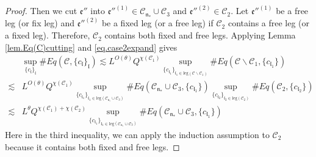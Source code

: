 \begin{proof}
    Then we cut $\mathfrak{e}''$ into $\mathfrak{e}''^{(1)}\in \mathcal{C}_{\mathfrak{n}_*}\cup \mathcal{C}_3$ and $\mathfrak{e}''^{(2)}\in \mathcal{C}_2$. Let $\mathfrak{e}''^{(1)}$ be a free leg (or fix leg) and $\mathfrak{e}''^{(2)}$ be a fixed leg (or a free leg) if $\mathcal{C}_2$ contains a free leg (or a fixed leg). Therefore, $\mathcal{C}_2$ contains both fixed and free legs. Applying Lemma \ref{lem.Eq(C)cutting} and \eqref{eq.case2expand} gives
    \begin{equation}\label{eq.case2expand'}
    \begin{split}
     &\sup_{\{c_{\mathfrak{l}}\}_{\mathfrak{l}}}\#Eq(\mathcal{C},\{c_{\mathfrak{l}}\}_{\mathfrak{l}})
     \lesssim L^{O(\theta)} Q^{\chi(\mathcal{C}_1)}\sup_{\{c_{\mathfrak{l}_1}\}_{\mathfrak{l}_1\in \text{leg}(\mathcal{C}\backslash\mathcal{C}_1)} } \# Eq(\mathcal{C}\backslash\mathcal{C}_1,\{c_{\mathfrak{l}_1}\})
     \\
     \lesssim& L^{O(\theta)} Q^{\chi(\mathcal{C}_1)}\sup_{\{c_{\mathfrak{l}_1}\}_{\mathfrak{l}_1\in \text{leg}(\mathcal{C}_{\mathfrak{n}_*}\cup \mathcal{C}_3)} } \# Eq(\mathcal{C}_{\mathfrak{n}_*}\cup \mathcal{C}_3,\{c_{\mathfrak{l}_1}\}) \sup_{\{c_{\mathfrak{l}_2}\}_{\mathfrak{l}_2\in \text{leg}(\mathcal{C}_2)} }\# Eq(\mathcal{C}_{2}, \{c_{\mathfrak{l}_2}\})
     \\
     \lesssim& L^\theta Q^{\chi(\mathcal{C}_1)+\chi(\mathcal{C}_2)}\sup_{\{c_{\mathfrak{l}_1}\}_{\mathfrak{l}_1\in \text{leg}(\mathcal{C}_{\mathfrak{n}_*}\cup \mathcal{C}_3)} } \# Eq(\mathcal{C}_{\mathfrak{n}_*}\cup \mathcal{C}_3,\{c_{\mathfrak{l}_1}\}) 
    \end{split}
    \end{equation}
    Here in the third inequality, we can apply the induction assumption to $\mathcal{C}_2$ because it contains both fixed and free legs.
    

\end{proof}
